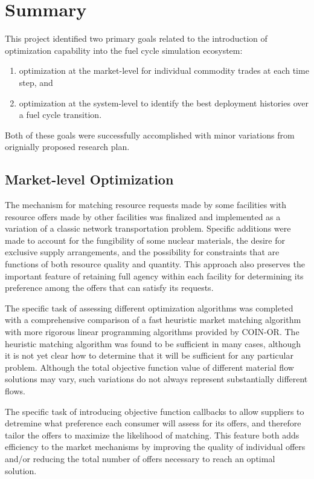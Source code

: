 \section{Summary}

This project identified two primary goals related to the introduction of
optimization capability into the \Cyclus{} fuel cycle simulation ecosystem:
\begin{enumerate}
\item optimization at the market-level for individual commodity trades at each time step, and 
\item optimization at the system-level to identify the best deployment
  histories over a fuel cycle transition.
\end{enumerate}
\noindent Both of these goals were successfully accomplished with minor variations from
orignially proposed research plan.

\subsection{Market-level Optimization}

The mechanism for matching resource requests made by some facilities with
resource offers made by other facilities was finalized and implemented as a
variation of a classic network transportation problem.  Specific additions
were made to account for the fungibility of some nuclear materials, the desire
for exclusive supply arrangements, and the possibility for constraints that
are functions of both resource quality and quantity.  This approach also
preserves the important feature of retaining full agency within each facility
for determining its preference among the offers that can satisfy its requests.

The specific task of assessing different optimization algorithms was completed
with a comprehensive comparison of a fast heuristic market matching algorithm
with more rigorous linear programming algorithms provided by \gls{COIN-OR}.
The heuristic matching algorithm was found to be sufficient in many cases,
although it is not yet clear how to determine that it will be sufficient for
any particular problem.  Although the total objective function value of
different material flow solutions may vary, such variations do not always
represent substantially different flows.

The specific task of introducing objective function callbacks to allow
suppliers to detremine what preference each consumer will assess for its
offers, and therefore tailor the offers to maximize the likelihood of
matching.  This feature both adds efficiency to the market mechanisms by
improving the quality of individual offers and/or reducing the total number of
offers necessary to reach an optimal solution.

